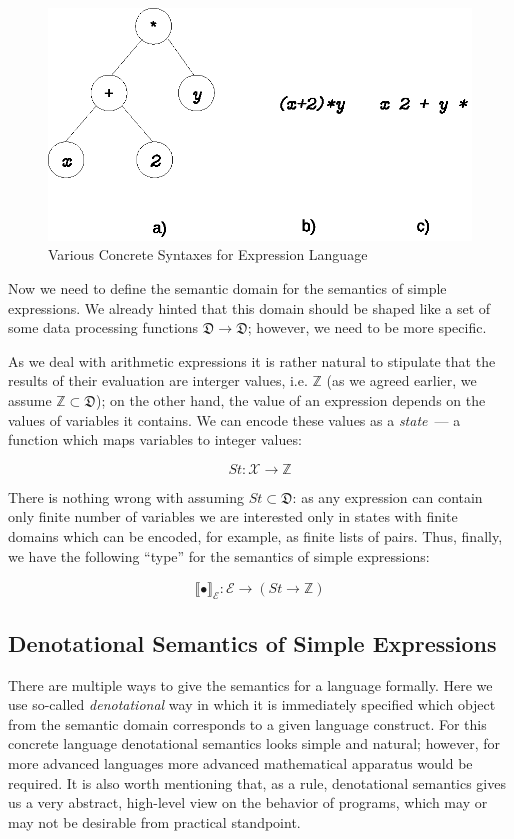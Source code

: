 \documentclass{article}
\newcommand{\sembr}[1]{\llbracket{#1}\rrbracket}
\newcommand{\ph}{{\phantom{x}}}
\begin{document}
\begin{figure}[t]
  \centering
  \includegraphics[scale=0.7]{images/02-02.eps}
  \caption{Various Concrete Syntaxes for Expression Language}
  \label{expression-concrete}
\end{figure}

Now we need to define the semantic domain for the semantics of simple expressions. We already hinted that this domain should be shaped like a set of some
data processing functions $\mathfrak{D}\to\mathfrak{D}$; however, we need to be more specific.

As we deal with arithmetic expressions it is rather natural to stipulate that the results of their evaluation are interger values, i.e. $\mathbb{Z}$ (as we agreed
earlier, we assume $\mathbb{Z}\subset\mathfrak{D}$); on the other hand, the value of an expression depends on the values of variables it contains. We can
encode these values as a \emph{state}~--- a function which maps variables to integer values:

\[
St : \mathscr{X} \to \mathbb{Z}
\]

There is nothing wrong with assuming $St\subset\mathfrak{D}$: as any expression can contain only finite number of variables we are interested only in
states with finite domains which can be encoded, for example, as finite lists of pairs. Thus, finally, we have the following ``type'' for the semantics
of simple expressions:

\[
\sembr{\bullet}^\ph_\mathscr{E}:\mathscr{E}\to(St\to\mathbb{Z})
\]

\subsection{Denotational Semantics of Simple Expressions}

There are multiple ways to give the semantics for a language formally. Here we use so-called \emph{denotational} way in which it is immediately
specified which object from the semantic domain corresponds to a given language construct. For this concrete language denotational semantics
looks simple and natural; however, for more advanced languages more advanced mathematical apparatus would be required. It is also worth mentioning that,
as a rule, denotational semantics gives us a very abstract, high-level view on the behavior of programs, which may or may not be desirable from
practical standpoint.
\end{document}
